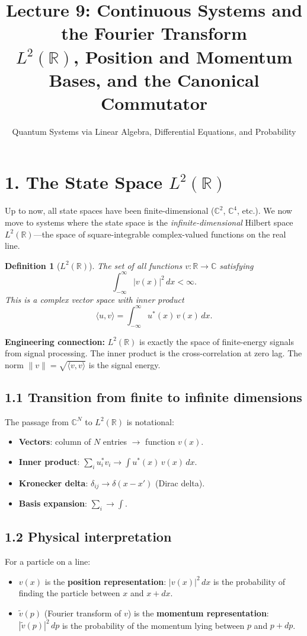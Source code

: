 \documentclass[12pt,a4paper]{article}
\title{\textbf{Lecture 9: Continuous Systems and the Fourier Transform} \\ \large $L^2(\mathbb{R})$, Position and Momentum Bases, and the Canonical Commutator}
\author{Quantum Systems via Linear Algebra, Differential Equations, and Probability}
\date{}
\newtheorem{definition}{Definition}
\begin{document}
\maketitle
\thispagestyle{fancy}

\section{1. The State Space $L^2(\mathbb{R})$}

Up to now, all state spaces have been finite-dimensional ($\mathbb{C}^2$, $\mathbb{C}^4$, etc.).  We now move to systems where the state space is the \emph{infinite-dimensional} Hilbert space $L^2(\mathbb{R})$---the space of square-integrable complex-valued functions on the real line.

\begin{definition}[$L^2(\mathbb{R})$]
The set of all functions $v : \mathbb{R} \to \mathbb{C}$ satisfying
\[
    \int_{-\infty}^{\infty} |v(x)|^2\,dx < \infty.
\]
This is a complex vector space with inner product
\[
    \langle u, v \rangle = \int_{-\infty}^{\infty} u^*(x)\,v(x)\,dx.
\]
\end{definition}

\noindent\textbf{Engineering connection:} $L^2(\mathbb{R})$ is exactly the space of finite-energy signals from signal processing.  The inner product is the cross-correlation at zero lag.  The norm $\|v\| = \sqrt{\langle v, v \rangle}$ is the signal energy.

\subsection{1.1 Transition from finite to infinite dimensions}
The passage from $\mathbb{C}^N$ to $L^2(\mathbb{R})$ is notational:
\begin{itemize}[nosep]
    \item \textbf{Vectors}: column of $N$ entries $\to$ function $v(x)$.
    \item \textbf{Inner product}: $\sum_i u_i^* v_i \to \int u^*(x)\,v(x)\,dx$.
    \item \textbf{Kronecker delta}: $\delta_{ij} \to \delta(x-x')$ (Dirac delta).
    \item \textbf{Basis expansion}: $\sum_i \to \int$.
\end{itemize}

\subsection{1.2 Physical interpretation}
For a particle on a line:
\begin{itemize}[nosep]
    \item $v(x)$ is the \textbf{position representation}: $|v(x)|^2\,dx$ is the probability of finding the particle between $x$ and $x+dx$.
    \item $\tilde{v}(p)$ (Fourier transform of $v$) is the \textbf{momentum representation}: $|\tilde{v}(p)|^2\,dp$ is the probability of the momentum lying between $p$ and $p+dp$.
\end{itemize}
\end{document}
